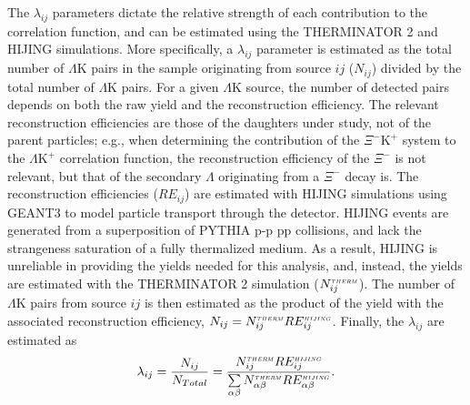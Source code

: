 \documentclass[ALICE,manyauthors]{cernphprep}
\newcommand{\Lam}{$\Lambda$\xspace}
\newcommand{\LamK}{$\Lambda$K\xspace}
\newcommand{\LamKchP}{$\Lambda\mathrm{K^{+}}$\xspace}
\newcommand{\XiKchP}{$\Xi^{-}\mathrm{K^{+}}$\xspace}
\begin{document}
The $\lambda_{ij}$ parameters dictate the relative strength of each contribution to the correlation function, and can be estimated using the THERMINATOR 2 and HIJING simulations.
More specifically, a $\lambda_{ij}$ parameter is estimated as the total number of \LamK pairs in the sample originating from source $ij$ ($N_{ij}$) divided by the total number of \LamK pairs.
For a given \LamK source, the number of detected pairs depends on both the raw yield and the reconstruction efficiency.
{\color{blue}The relevant reconstruction efficiencies are those of the daughters under study, not of the parent particles; e.g., when determining the contribution of the \XiKchP system to the \LamKchP correlation function, the reconstruction efficiency of the $\Xi^{-}$ is not relevant, but that of the secondary \Lam originating from a $\Xi^{-}$ decay is.}
The reconstruction efficiencies ($RE_{ij}$) are estimated with HIJING simulations using GEANT3 to model particle transport through the detector.
HIJING events are generated from a superposition of PYTHIA {\color{red}p-p} {\color{blue}pp} collisions, and lack the strangeness saturation of a fully thermalized medium.
As a result, HIJING is unreliable in providing the yields needed for this analysis, and, instead, the yields are estimated with the THERMINATOR 2 simulation ($N_{ij}^{\scaleto{THERM}{3pt}}$).
The number of \LamK pairs from source $ij$ is then estimated as the product of the yield with the associated reconstruction efficiency, $N_{ij} = N_{ij}^{\scaleto{THERM}{3pt}}RE_{ij}^{\scaleto{HIJING}{3pt}}$.
Finally, the $\lambda_{ij}$ are estimated as
\begin{equation}
\lambda_{ij} = \frac{N_{ij}}{N_{Total}} = \frac{N_{ij}^{\scaleto{THERM}{3pt}}RE_{ij}^{\scaleto{HIJING}{3pt}}}{\sum\limits_{\alpha\beta} N_{\alpha\beta}^{\scaleto{THERM}{3pt}}RE_{\alpha\beta}^{\scaleto{HIJING}{3pt}}}.
\end{equation}
\end{document}
